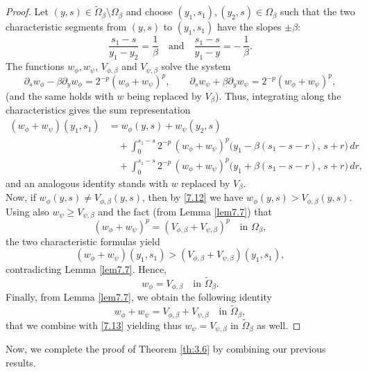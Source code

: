 \documentclass[
  sn-mathphys-num,
  colorlinks,
  linkcolor=darkmagenta,
  citecolor=rufous,
  urlcolor=zaffre,
  hypertexnames=false
]{sn-jnl}
\numberwithin{equation}{section}
\begin{document}
\begin{proof}
Let $(y,s)\in \tilde{\Omega}_\beta\setminus \Omega_\beta$ and choose $(y_1,s_1),(y_2,s)\in\Omega_\beta$ such that the two characteristic segments from $(y,s)$ to $(y_1,s_1)$ have the slopes $\pm\beta$:
$$
\frac{s_1-s}{y_1-y_2}=\frac{1}{\beta}\quad\text{and}\quad \frac{s_1-s}{y_1-y}=-\,\frac{1}{\beta}.
$$
The functions $w_\phi,w_\psi$, $V_{\phi,\beta}$ and $V_{\psi,\beta}$ solve the  system
$$
\partial_s w_\phi-\beta\partial_y w_\phi=2^{-p}(w_\phi+w_\psi)^p,\qquad
\partial_s w_\psi+\beta\partial_y w_\psi=2^{-p}(w_\phi+w_\psi)^p,
$$
(and the same holds with $w$ being replaced by $V_\beta$). Thus, integrating along the characteristics gives the sum representation
$$
\begin{aligned}
(w_\phi+w_\psi)(y_1,s_1)
&=w_\phi(y,s)+w_\psi(y_2,s)
\\&\quad+\int_{0}^{s_1-s}\!2^{-p}\,(w_\phi+w_\psi)^p\!\bigl(y_1-\beta(s_1-s-r),\,s+r\bigr)\,dr
\\&\quad+\int_{0}^{s_1-s}\!2^{-p}\,(w_\phi+w_\psi)^p\!\bigl(y_1+\beta(s_1-s-r),\,s+r\bigr)\,dr,
\end{aligned}
$$
and an analogous identity stands with $w$ replaced by $V_\beta$.\\
Now, if $w_\phi(y,s)\neq V_{\phi,\beta}(y,s)$, then by \eqref{7.12} we have $w_\phi(y,s)>V_{\phi,\beta}(y,s)$.\\ Using also $w_\psi\ge V_{\psi,\beta}$ and the fact (from Lemma \ref{lem7.7}) that
$$
(w_\phi+w_\psi)^p=(V_{\phi,\beta}+V_{\psi,\beta})^p\quad\text{in }\Omega_\beta,
$$
the two characteristic formulas yield
$$
(w_\phi+w_\psi)(y_1,s_1)>(V_{\phi,\beta}+V_{\psi,\beta})(y_1,s_1),
$$
contradicting Lemma \ref{lem7.7}. Hence,
\begin{equation}\label{7.13}
w_\phi=V_{\phi,\beta}\quad\text{in }\tilde{\Omega}_\beta.
\end{equation}
Finally, from Lemma \ref{lem7.7}, we obtain the following identity
$$
w_\phi+w_\psi=V_{\phi,\beta}+V_{\psi,\beta}\quad\text{in }\tilde{\Omega}_\beta,
$$
that we combine with \eqref{7.13} yielding thus  $w_\psi=V_{\psi,\beta}$ in $\tilde{\Omega}_\beta$ as well.
\end{proof}
Now, we complete the proof of Theorem \ref{th:3.6} by combining our previous results.
\end{document}
